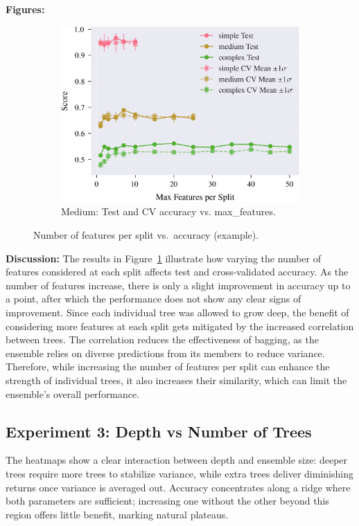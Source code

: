 \documentclass[conference]{IEEEtran}
\begin{document}
\textbf{Figures:}
\begin{figure}[H]
  \centering
  \begin{subfigure}[b]{\columnwidth}
    \centering
    \includegraphics[width=\linewidth]{images/all_datasets_accuracy_vs_features.png}
    \caption{Medium: Test and CV accuracy vs. max\_features.}
    \label{fig:exp2-medium-acc}
  \end{subfigure}
  \caption{Number of features per split vs.\ accuracy (example).}
  \label{fig:exp2-accuracy-features}
\end{figure}


\textbf{Discussion:}
The results in Figure~\ref{fig:exp2-medium-acc} illustrate how varying the number of features considered at each split affects test and cross-validated 
  accuracy. As the number of features increase, there is only a slight improvement in accuracy up to a point, after which the performance does not show any clear signs 
  of improvement. Since each individual tree was allowed to grow deep, the benefit of considering more features at each split gets mitigated by the increased correlation 
  between trees. The correlation reduces the effectiveness of bagging, as the ensemble relies on diverse predictions from its members to reduce variance. Therefore, 
  while increasing the number of features per split can enhance the strength of individual trees, it also increases their similarity, which can limit the ensemble's
  overall performance.

\subsection{Experiment 3: Depth vs Number of Trees}
\label{sec:results-exp3}
The heatmaps show a clear interaction between depth and ensemble size: deeper trees require more trees to stabilize variance, while extra trees deliver diminishing returns once variance is averaged out. Accuracy concentrates along a ridge where both parameters are sufficient; increasing one without the other beyond this region offers little benefit, marking natural plateaus.
\end{document}
